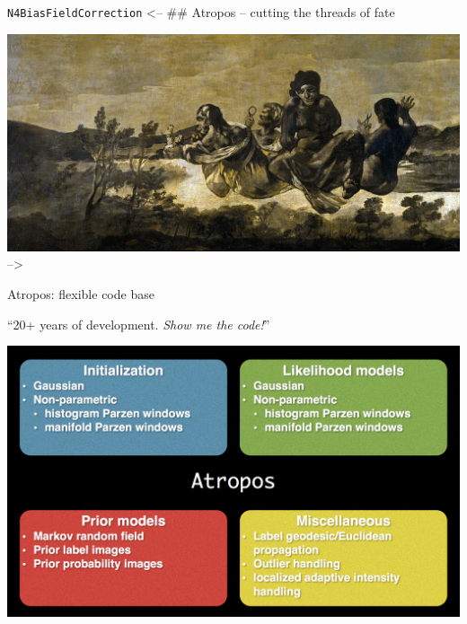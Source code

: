 \documentclass[ignorenonframetext,]{beamer}
\begin{document}
\begin{frame}[fragile]{\texttt{N4BiasFieldCorrection}}
\textless{}-- \#\# Atropos -- cutting the threads of fate

\includegraphics{./papers/figures/Atropos_deGoya.jpg} --\textgreater{}

\end{frame}

\begin{frame}{Atropos: flexible code base}

``20+ years of development. \emph{Show me the code!}''

\includegraphics{./tools/atropos/figures/atropos.png}

\end{frame}
\end{document}

